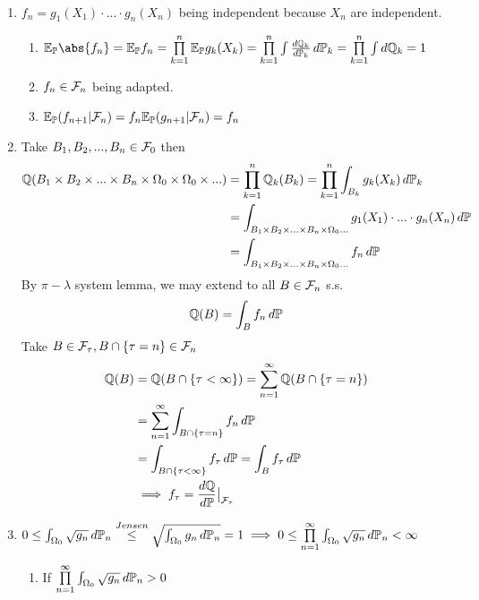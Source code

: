 \newpage 
\pf \\
\begin{enumerate}
    \item $f_n = g_1(X_1) \cdot ... \cdot g_n(X_n)$ being independent because $X_n$ are independent.
    \begin{enumerate}
        \item $\E_\prob\abs{f_n} = \E_\prob f_n = \bigp{k=1}^n \E_\prob g_k(X_k) = \bigp{k=1}^n \int \frac{\diff \Q_k}{\diff \prob_k} \diff \prob_k = \bigp{k=1}^n \int \diff \Q_k = 1$ 
        \item $f_n \in \mathcal{F}_n$ being adapted.
        \item $\mathbb{E}_{\mathbb{P}}(f_{n+1}|\mathcal{F}_n) = f_n \mathbb{E}_{\mathbb{P}}(g_{n+1}|\mathcal{F}_n) = f_n$
    \end{enumerate}
    \item Take $B_1, B_2, ..., B_n \in \mathcal{F}_0$ then
    \begin{align*}
        \mathbb{Q}(B_1\times B_2 \times ... \times B_n \times \Omega_0 \times \Omega_0 \times... ) &= \prod\limits_{k=1}^n\mathbb{Q}_k(B_k) = \prod\limits_{k=1}^n \int_{B_k} g_k(X_k) \mathop{}\!d\mathbb{P}_k \\
        &= \int_{B_1\times B_2 \times ... \times B_n \times \Omega_0...} g_1(X_1)\cdot...\cdot g_n(X_n) \mathop{}\!d\mathbb{P} \\
        &= \int_{B_1\times B_2 \times ... \times B_n \times \Omega_0...} f_n \mathop{}\!d\mathbb{P}
    \end{align*}By $\pi-\lambda$ system lemma, we may extend to all $B\in \mathcal{F}_n$ s.s. \begin{equation*}
        \mathbb{Q}(B) = \int_B f_n \mathop{}\!d \mathbb{P}
    \end{equation*}
    Take $B\in\mathcal{F}_\tau, B\cap \{\tau = n\}\in \mathcal{F}_n$ 
    \begin{align*}
        \mathbb{Q}(B) &= \mathbb{Q}(B\cap \{\tau < \infty\}) = \sum\limits_{n=1}^\infty \mathbb{Q}(B\cap \{\tau = n\}) \\
        &= \sum\limits_{n=1}^\infty \int_{B\cap \{\tau = n\}} f_n \mathop{}\!d\mathbb{P} \\
        &= \int_{B\cap \{\tau < \infty\}} f_\tau \mathop{}\!d\mathbb{P} = \int_{B} f_\tau \mathop{}\!d\mathbb{P} \\
        &\implies f_\tau = \frac{\mathop{}\!d \mathbb{Q}}{\mathop{}\!d \mathbb{P}}\big|_{\mathcal{F}_\tau}
    \end{align*}
    \item $0 \leq \int_{\Omega_0} \sqrt{g_n} \mathop{}\!d\mathbb{P}_n \stackrel{Jensen}{\leq} \sqrt{\int_{\Omega_0} g_n \mathop{}\!d\mathbb{P}_n} =1 \implies 0\leq \prod\limits_{n=1}^\infty \int_{\Omega_0} \sqrt{g_n} \mathop{}\!d\mathbb{P}_n <\infty$
    \begin{enumerate}
        \item If $\prod\limits_{n=1}^\infty \int_{\Omega_0} \sqrt{g_n} \mathop{}\!d \mathbb{P}_n >0$
    \end{enumerate}
\end{enumerate}
